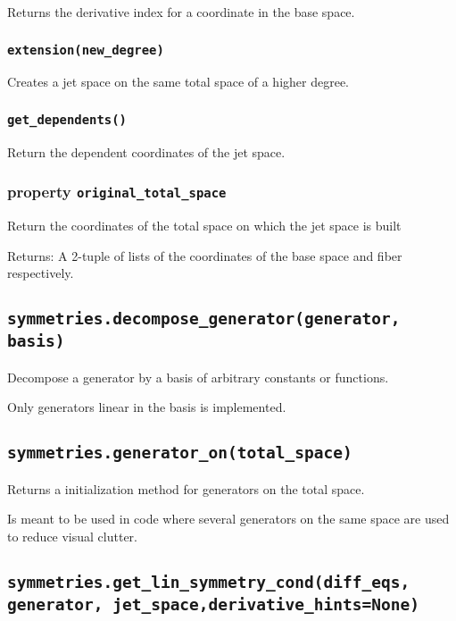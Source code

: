       Returns the derivative index for a coordinate in the base space.

   \subsubsection*{\lstinline{extension(new_degree)}}

      Creates a jet space on the same total space of a higher degree.

   \subsubsection*{\lstinline{get_dependents()}}

      Return the dependent coordinates of the jet space.

   \subsubsection*{property \lstinline{original_total_space}}

      Return the coordinates of the total space on which the jet
      space is built

      Returns:
         A 2-tuple of lists of the coordinates of the base space and
         fiber respectively.

\subsection*{\lstinline{symmetries.decompose_generator(generator, basis)}}

   Decompose a generator by a basis of arbitrary constants or
   functions.

   Only generators linear in the basis is implemented.

\subsection*{\lstinline{symmetries.generator_on(total_space)}}

   Returns a initialization method for generators on the total space.

   Is meant to be used in code where several generators on the same
   space are used to reduce visual clutter.

\subsection*{\lstinline{symmetries.get_lin_symmetry_cond(diff_eqs, generator, jet_space,}\newline\lstinline{derivative_hints=None)}}

